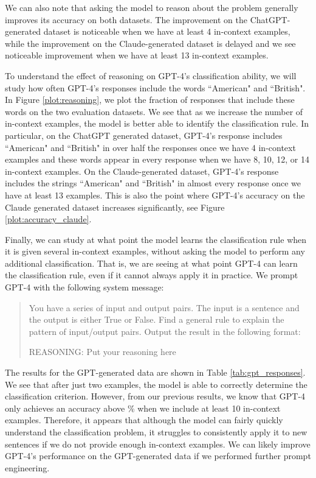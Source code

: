 \documentclass{article}
\begin{document}
We can also note that asking the model to reason about the problem generally improves its accuracy on both datasets. The improvement on the ChatGPT-generated dataset is noticeable when we have at least 4 in-context examples, while the improvement on the Claude-generated dataset is delayed and we see noticeable improvement when we have at least 13 in-context examples.

To understand the effect of reasoning on GPT-4's classification ability, we will study how often GPT-4's responses include the words ``American" and ``British".
In Figure \ref{plot:reasoning}, we plot the fraction of responses that include these words on the two evaluation datasets.
We see that as we increase the number of in-context examples, the model is better able to identify the classification rule.
In particular, on the ChatGPT generated dataset, GPT-4's response includes ``American" and ``British" in over half the responses once we have 4 in-context examples and these words appear in every response when we have 8, 10, 12, or 14 in-context examples.
On the Claude-generated dataset, GPT-4's response includes the strings ``American" and ``British" in almost every response once we have at least 13 examples. 
This is also the point where GPT-4's accuracy on the Claude generated dataset increases significantly, see Figure \ref{plot:accuracy_claude}.

Finally, we can study at what point the model learns the classification rule when it is given several in-context examples, without asking the model to perform any additional classification.
That is, we are seeing at what point GPT-4 can learn the classification rule, even if it cannot always apply it in practice. 
We prompt GPT-4 with the following system message:
\begin{center}
\begin{quote}
You have a series of input and output pairs. The input is a sentence and the output is either True or False.
Find a general rule to explain the pattern of input/output pairs.
Output the result in the following format:

REASONING: {Put your reasoning here}
\end{quote}
\end{center}

The results for the GPT-generated data are shown in Table \ref{tab:gpt_responses}.
We see that after just two examples, the model is able to correctly determine the classification criterion.
However, from our previous results, we know that GPT-4 only achieves an accuracy above \% when we include at least 10 in-context examples.
Therefore, it appears that although the model can fairly quickly understand the classification problem, it struggles to consistently apply it to new sentences if we do not provide enough in-context examples.
We can likely improve GPT-4's performance on the GPT-generated data if we performed further prompt engineering.
\end{document}
